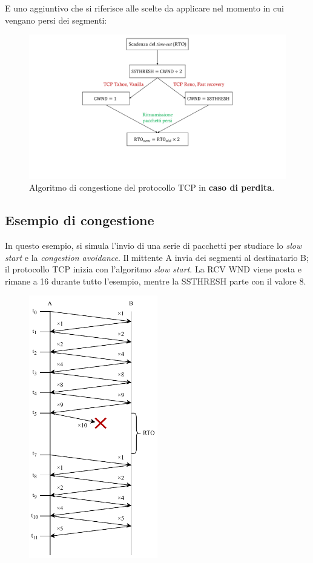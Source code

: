 \documentclass[a4paper]{article}
\begin{document}
	\noindent	
	E uno aggiuntivo che si riferisce alle scelte da applicare nel momento in cui vengano persi dei segmenti:
	\begin{figure}[!htp]
		\centering
		\includegraphics[width=\textwidth]{img/algoritmo_congestione_TCP_perdita.pdf}
		\caption{Algoritmo di congestione del protocollo TCP in \textbf{caso di perdita}.}
	\end{figure}
	\newpage
	
	\subsection{Esempio di congestione}
	
	In questo esempio, si simula l’invio di una serie di pacchetti per studiare lo \emph{slow start} e la \emph{congestion avoidance}. Il mittente A invia dei segmenti al destinatario B; il protocollo TCP inizia con l’algoritmo \emph{slow start}. La \textsf{RCV WND} viene posta e rimane a 16 durante tutto l’esempio, mentre la \textsf{SSTHRESH} parte con il valore 8.
	
	\begin{figure}
		\centering
		\includegraphics[width=0.5\textwidth]{img/esempio_congestione.pdf}
	\end{figure}
\end{document}
